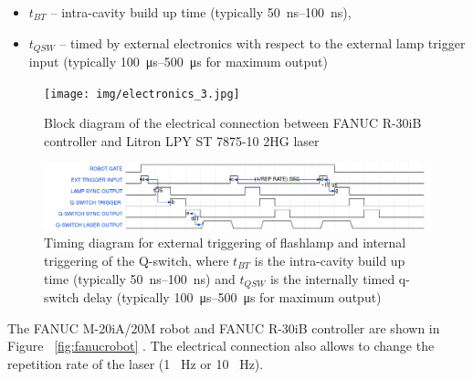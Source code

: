 \begin{itemize}
    \item $t_{BT}$ -- intra-cavity build up time (typically \SIrange{50}{100}{\ns}),
    \item $t_{QSW}$ -- timed by external electronics with respect to the external lamp trigger input (typically \SIrange{100}{500}{\us} for maximum output)

\end{itemize}


\begin{figure}[h]
    \centering
    \texttt{[image: img/electronics\_3.jpg]}
    \caption[Block diagram of the electrical connection]{Block diagram of the electrical connection between FANUC R-30iB controller and Litron LPY ST 7875-10 2HG laser}
    \label{fig:electronics}
\end{figure}

\begin{figure}[h]
    \centering
    \includegraphics[width=1.0\linewidth]{img/wavedrom_bigger.png}
    \caption[Timing diagram for triggering of flashlamp and the Q-switch]{Timing diagram for external triggering of flashlamp and internal triggering of the Q-switch, where $t_{BT}$ is the intra-cavity build up time (typically \SIrange{50}{100}{\ns}) and $t_{QSW}$ is the internally timed q-switch delay (typically \SIrange{100}{500}{\us} for maximum output)}
    \label{fig:wave}
\end{figure}
The  FANUC M-20iA/20M robot and FANUC R-30iB controller are shown in Figure~ \ref{fig:fanucrobot} \cite{fanucrobotcontroller}. The electrical connection also allows to change the repetition rate of the laser (1 \SI{}{\hertz} or 10 \SI{}{\hertz}).



